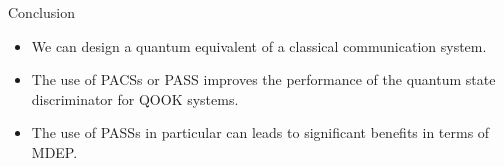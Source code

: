 \begin{frame}{Conclusion}
    \begin{itemize}
        \item We can design a quantum equivalent of a classical communication system.
        \item The use of PACSs or PASS improves the performance of the 
                quantum state discriminator for QOOK systems.
        \item The use of PASSs in particular can leads to significant benefits in terms of
                MDEP.
    \end{itemize}
\end{frame}